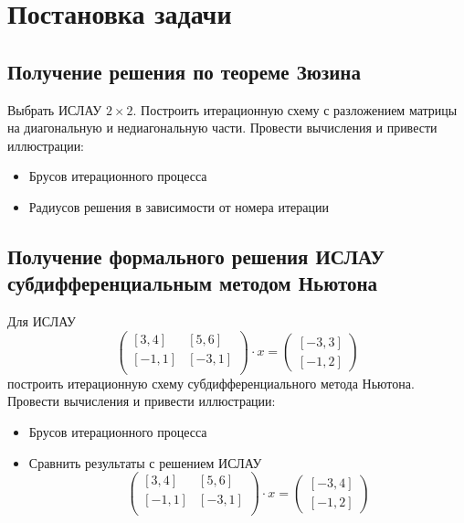\documentclass[a4paper,12pt]{article}
\begin{document}
    
    \newpage
    
    \tableofcontents
    \newpage

    \section{Постановка задачи}
    \subsection{Получение решения по теореме Зюзина}
    Выбрать ИСЛАУ $ 2 \times 2 $. Построить итерационную схему с разложением матрицы на диагональную и недиагональную части.\newline
    Провести вычисления и привести иллюстрации:
    \begin{itemize}
        \item Брусов итерационного процесса
        \item Радиусов решения в зависимости от номера итерации
    \end{itemize}

    \subsection{Получение формального решения ИСЛАУ субдифференциальным методом Ньютона}
    Для ИСЛАУ
    \begin{equation}
        \begin{pmatrix}
            [3, 4] & [5, 6] \\
            [-1, 1] & [-3, 1] \\
        \end{pmatrix}
        \cdot x = 
        \begin{pmatrix}
            [-3, 3] \\
            [-1, 2]
        \end{pmatrix}
        \label{eq:subdifftask1}
    \end{equation}
    построить итерационную схему субдифференциального метода Ньютона.\newline
    Провести вычисления и привести иллюстрации:
    \begin{itemize}
        \item Брусов итерационного процесса
        \item Сравнить результаты с решением ИСЛАУ
        \begin{equation}
            \begin{pmatrix}
                [3, 4] & [5, 6] \\
                [-1, 1] & [-3, 1] \\
            \end{pmatrix}
            \cdot x = 
            \begin{pmatrix}
                [-3, 4] \\
                [-1, 2]
            \end{pmatrix}
        \end{equation}
        \label{eq:subdifftask2}
    \end{itemize}
\end{document}
